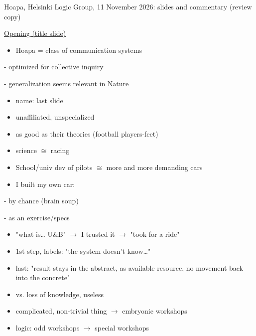 \documentclass[a4paper,10pt]{article}
\newcommand{\slidehead}[2]{\par\addvspace{7pt}\noindent\underline{#1}\hfill{\color{gray}#2}\par\nopagebreak\vspace{1pt}}
\newcommand{\marked}[1]{\par\addvspace{2pt}{\bfseries #1}\par\nopagebreak}
\renewenvironment{leftbar}{%
  \def\FrameCommand{{\color{black!30}\vrule width 1.2pt}\hspace{6pt}}%
  \MakeFramed{\advance\hsize-\width \FrameRestore}}{\endMakeFramed}
\newenvironment{commentary}{\par\vspace{-2pt}\begin{leftbar}\color{black!80}}{\end{leftbar}}
\begin{document}
\small
{\normalsize Hoapa, Helsinki Logic Group, 11 November 2026: slides and commentary (review copy)\par}
\slidehead{Opening (title slide)}{}
\begin{commentary}
\marked{Title}
\begin{itemize}
\item Hoapa = class of communication systems
\end{itemize}
- optimized for collective inquiry\par
- generalization seems relevant in Nature\par
\begin{itemize}
\item name: last slide
\end{itemize}
\marked{My name}
\begin{itemize}
\item unaffiliated, unspecialized
\item as good as their theories (football players-feet)
\item science \ensuremath{\cong} racing
\item School/univ dev of pilots \ensuremath{\cong} more and more demanding cars
\end{itemize}\vspace{2pt}
\begin{itemize}
\item I built my own car:
\end{itemize}
- by chance (brain soup)\par
- as an exercise/specs\par
\begin{itemize}
\item "what is… U\&B" \ensuremath{\to} I trusted it \ensuremath{\to} "took for a ride"
\end{itemize}\vspace{2pt}
\begin{itemize}
\item 1st step, labels: "the system doesn't know…"
\item last: "result stays in the abstract, as available resource, no movement back into the concrete"
\item vs. loss of knowledge, useless
\item complicated, non-trivial thing \ensuremath{\to} embryonic workshops
\end{itemize}\vspace{2pt}
\begin{itemize}
\item logic: odd workshops \ensuremath{\to} special workshops
\end{itemize}
\end{commentary}
\end{document}
